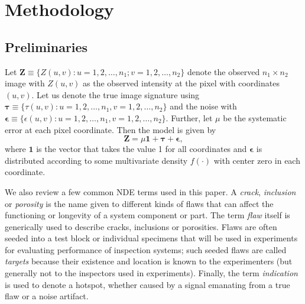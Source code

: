 \documentclass[12pt]{article}
\newcommand{\bepsilon}{\boldsymbol{\epsilon}}
\newcommand{\btau}{\boldsymbol{\tau}}
\newcommand{\bZ}{\boldsymbol{Z}}
\newcommand{\bone}{\boldsymbol{1}}
\begin{document}
\section{Methodology}
\label{methodology}
\subsection{Preliminaries}
Let $\bZ \equiv \{Z(u,v):u=1,2,\ldots,n_1; v=1,2,\ldots,n_2\}$ denote
the observed $n_1\times n_2$ image with $Z(u,v)$ as the observed
intensity at the pixel with coordinates $(u,v)$. Let us denote the
true image signature using  
$\btau\equiv \{\tau(u,v):u=1,2,\ldots,n_1, v=1,2,\ldots,n_2\}$ and the
noise  with $\bepsilon\equiv \{\epsilon(u,v):u=1,2,\ldots,n_1,
v=1,2,\ldots,n_2\}$. Further, let $\mu$ be the systematic error at
each pixel coordinate. Then the model is given by 
\begin{equation}
\label{model}
  \bZ = \mu\bone + \btau + \bepsilon,
\end{equation}
where $\bone$ is the vector that takes the value 1 for all coordinates
and $\bepsilon$ is distributed 
according to some multivariate density $f(\cdot)$ with center zero in
each coordinate. 

We also review a few common NDE terms used in this paper. A
{\em crack}, {\em inclusion} or {\em porosity} is the name given to
different kinds of flaws that can affect the functioning or longevity of a
system component or part. The term {\em flaw} itself is generically
used to describe cracks, inclusions or porosities. Flaws are often
seeded into a test block or individual specimens that will be used in
experiments for evaluating performance of inspection systems; such
seeded flaws are called {\em targets}  because their existence and
location is known to the experimenters (but generally not to the
inspectors used in experiments). Finally, the term {\em indication} is
used to denote a hotspot, whether caused by a signal emanating from a true
flaw or a noise artifact.  
\end{document}
